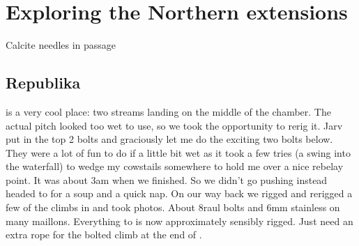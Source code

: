 \section{Exploring the Northern extensions}

\begin{marginfigure}
	\centering
         \caption{Calcite needles in \protect{} passage }
         \label{calcite needles}
 \end{marginfigure}

\subsection{Republika}  is a very cool place: two streams landing on the middle of the chamber. The actual pitch looked too wet to use, so we took the opportunity to rerig it. 
Jarv put in the top 2 bolts and graciously let me do the exciting two bolts below.  They were a lot of fun to do if a little bit wet as it took a few tries (a swing into the waterfall) to wedge my cowstails somewhere to hold me over a nice rebelay point. It was about 3am when we finished. So we didn't go pushing instead headed to  for a soup and a quick nap.  On our way back we rigged and rerigged a few of the climbs in  and took photos. About 8raul bolts and 6mm stainless on many maillons.
Everything to  is now approximately sensibly rigged. Just need an extra rope for the bolted climb at the end of .




